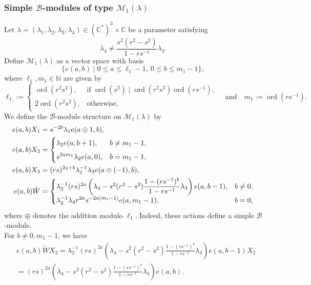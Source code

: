 \documentclass[12 pt,reqno]{amsart}
\numberwithin{equation}{section}
\DeclareMathOperator{\ord}{ord}
\theoremstyle{definition}
\theoremstyle{definition}
\theoremstyle{remark}
\theoremstyle{remark}
\begin{document}
\subsubsection{\texorpdfstring {\textbf{\upshape Simple $\mathcal{B}$-modules of type $\mathcal{M}_1(\lambda)$}}{}}
Let $ \lambda = (\lambda_1, \lambda_2, \lambda_3, \lambda_4) \in (\mathbb{C}^*)^3 \times \mathbb{C} $ be a parameter satisfying 
$$
    \lambda_4 \neq \frac{s^2 (r^2 - s^2)}{1 - rs^{-1}} \lambda_3.
$$  
Define $ \mathcal{M}_1(\lambda) $ as a vector space with basis  
$$
    \{ e(a, b) \mid 0 \leq a \leq \ell_1 - 1, \ 0 \leq b \leq m_1 - 1 \},
$$  
where $ \ell_1, m_1 \in \mathbb{N} $ are given by  
\begin{equation}\label{Eq5.1}
    \ell_1 := 
    \begin{cases}
        \ord(r^{2}s^2), & \text{if } \ord(s^2) \mid \ord(r^{2}s^2) \ord(rs^{-1}), \\[5pt]
        2\ord(r^{2}s^2), & \text{otherwise},
    \end{cases} \quad \text{and}\quad  m_1 := \ord(rs^{-1}).
\end{equation}
We define the $ \mathcal{B}$-module structure on $ \mathcal{M}_1(\lambda) $ by
\begin{align}\label{Eq5.2}
    e(a,b)X_1 &= s^{-2b} \lambda_1 e(a \oplus 1, b),\\
    \label{Eq5.3}
    e(a,b)X_2 &= 
    \begin{cases}
        \lambda_2 e(a,b+1), & b \neq m_1 - 1, \\[5pt]
        \displaystyle s^{2 a m_1} \lambda_2 e(a,0), & b = m_1 - 1,
    \end{cases}\\ \label{Eq5.4}
e(a,b)X_3 &= (rs)^{2a+b} \lambda_1^{-1} \lambda_3 e(a \oplus (-1), b),\\
e(a,b)\tilde{W}&=\begin{cases}
    \lambda_2^{-1}(rs)^{2a}\left(\lambda_4-s^2(r^2-s^2)\displaystyle\frac{1-(rs^{-1})^b}{1-rs^{-1}}\lambda_3\right)e(a,b-1), & b \neq 0,\\
    \displaystyle\lambda_2^{-1}\lambda_4 r^{2a}s^{-2a(m_1-1)}e(a,m_1-1), & b =0,
\end{cases}\notag
\end{align} where $\oplus$ denotes the addition modulo $\ell_1$.
Indeed, these actions define a simple $\mathcal{B}$-module.\\
For $b \neq 0,m_1-1$, we have 
\begin{align*}
    &e(a,b)\tilde{W}X_2=\lambda_2^{-1}(rs)^{2a}\left(\lambda_4-s^2(r^2-s^2)\displaystyle\frac{1-(rs^{-1})^b}{1-rs^{-1}}\lambda_3\right)e(a,b-1)X_2\\
    &=(rs)^{2a}\left(\lambda_4-s^2(r^2-s^2)\displaystyle\frac{1-(rs^{-1})^b}{1-rs^{-1}}\lambda_3\right)e(a,b).
\end{align*}
\end{document}
